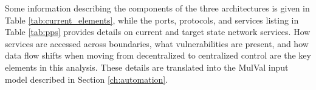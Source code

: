 


Some information describing the components of the three architectures is given in Table \ref{tab:current_elements}, while the ports, protocols, and services listing in Table \ref{tab:pps} provides details on current and target state network services. How services are accessed across boundaries, what vulnerabilities are present, and how data flow shifts when moving from decentralized to centralized control are the key elements in this analysis. These details are translated into the MulVal input model described in Section \ref{ch:automation}. %

